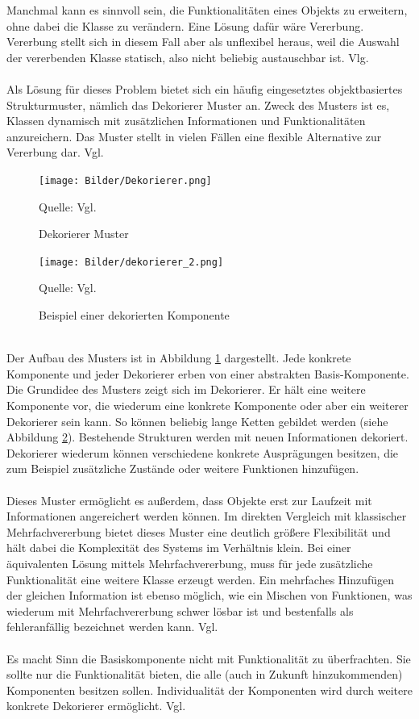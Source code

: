 \documentclass[fontsize=11pt,a4paper,final]{scrreprt}[2003/01/01]
\newcommand*{\quelle}{%
	\footnotesize Quelle: 
}
\begin{document}
Manchmal kann es sinnvoll sein, die Funktionalitäten eines Objekts zu erweitern, ohne dabei die Klasse zu verändern. Eine Lösung dafür wäre Vererbung. Vererbung stellt sich in diesem Fall aber als unflexibel heraus, weil die Auswahl der vererbenden Klasse statisch, also nicht beliebig austauschbar ist. Vlg. \cite[S. 199]{gamma2004}
\\ \\
Als Lösung für dieses Problem bietet sich ein häufig eingesetztes objektbasiertes Strukturmuster, nämlich das Dekorierer Muster an. Zweck des Musters ist es, Klassen dynamisch mit zusätzlichen Informationen und Funktionalitäten anzureichern. Das Muster stellt in vielen Fällen eine flexible Alternative zur Vererbung dar. Vgl. \cite[S. 199 ]{gamma2004}

\begin{figure}[H]
	\centering
	\texttt{[image: Bilder/Dekorierer.png]}
	\caption{Dekorierer Muster}
	\quelle{ Vgl. \cite[S. 201]{gamma2004}}
	\label{fig:Dekorierer}
\end{figure}

\begin{figure}[H]
	\centering
	\texttt{[image: Bilder/dekorierer\_2.png]}
	\caption{Beispiel einer dekorierten Komponente}
	\quelle{Vgl. \cite[S. 205]{gamma2004}} 
	\label{fig:Beispiel einer dekorierten Komponente}
\end{figure}
\ \\
Der Aufbau des Musters ist in Abbildung \ref{fig:Dekorierer} dargestellt. Jede konkrete Komponente und jeder Dekorierer erben von einer abstrakten Basis-Komponente. Die Grundidee des Musters zeigt sich im Dekorierer. Er hält eine weitere Komponente vor, die wiederum eine konkrete Komponente oder aber ein weiterer Dekorierer sein kann. So können beliebig lange Ketten gebildet werden (siehe Abbildung \ref{fig:Beispiel einer dekorierten Komponente}). Bestehende Strukturen werden mit neuen Informationen \glqq dekoriert\grqq. Dekorierer wiederum können verschiedene konkrete Ausprägungen besitzen, die zum Beispiel zusätzliche Zustände oder weitere Funktionen hinzufügen.
\\ \\
Dieses Muster ermöglicht es außerdem, dass Objekte erst zur Laufzeit mit Informationen angereichert werden können. Im direkten Vergleich mit klassischer Mehrfachvererbung bietet dieses Muster eine deutlich größere Flexibilität und hält dabei die Komplexität des Systems im Verhältnis klein. Bei einer äquivalenten Lösung mittels Mehrfachvererbung, muss für jede zusätzliche Funktionalität eine weitere Klasse erzeugt werden. Ein mehrfaches Hinzufügen der gleichen Information ist ebenso möglich, wie ein Mischen von Funktionen, was wiederum mit Mehrfachvererbung schwer lösbar ist und bestenfalls als fehleranfällig bezeichnet werden kann. Vgl. \cite[S. 203]{gamma2004}
\\ \\
Es macht Sinn die Basiskomponente nicht mit Funktionalität zu überfrachten. Sie sollte nur die Funktionalität bieten, die alle (auch in Zukunft hinzukommenden) Komponenten besitzen sollen. Individualität der Komponenten wird durch weitere konkrete Dekorierer ermöglicht. Vgl. \cite[S. 203 - 204]{gamma2004}
\end{document}
